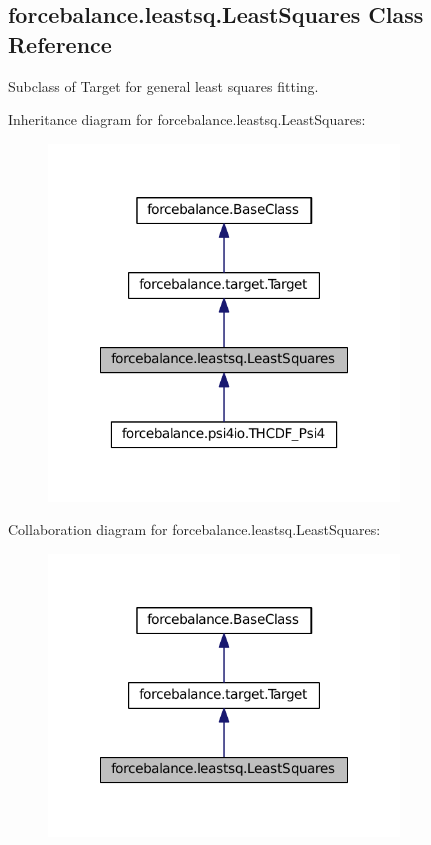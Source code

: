 \hypertarget{classforcebalance_1_1leastsq_1_1LeastSquares}{\subsection{forcebalance.\-leastsq.\-Least\-Squares \-Class \-Reference}
\label{classforcebalance_1_1leastsq_1_1LeastSquares}
}


\-Subclass of \-Target for general least squares fitting.  




\-Inheritance diagram for forcebalance.\-leastsq.\-Least\-Squares\-:
\nopagebreak
\begin{figure}[H]
\begin{center}
\leavevmode
\includegraphics[width=264pt]{classforcebalance_1_1leastsq_1_1LeastSquares__inherit__graph}
\end{center}
\end{figure}


\-Collaboration diagram for forcebalance.\-leastsq.\-Least\-Squares\-:
\nopagebreak
\begin{figure}[H]
\begin{center}
\leavevmode
\includegraphics[width=264pt]{classforcebalance_1_1leastsq_1_1LeastSquares__coll__graph}
\end{center}
\end{figure}
